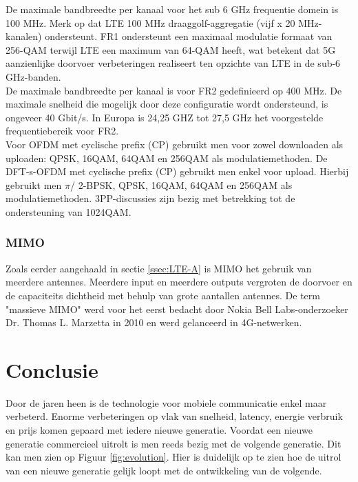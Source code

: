 \documentclass{article}
\begin{document}
\noindent De maximale bandbreedte per kanaal voor het sub 6 GHz frequentie domein is 100 MHz. Merk op dat LTE 100 MHz draaggolf-aggregatie (vijf x 20 MHz-kanalen) ondersteunt. FR1 ondersteunt een maximaal modulatie formaat van 256-QAM terwijl LTE een maximum van 64-QAM heeft, wat betekent dat 5G aanzienlijke doorvoer verbeteringen realiseert ten opzichte van LTE in de sub-6 GHz-banden. \cite{5gband} \cite{5gmodulation} \\

\noindent De maximale bandbreedte per kanaal is voor FR2 gedefinieerd op 400 MHz. De maximale snelheid die mogelijk door deze configuratie wordt ondersteund, is ongeveer 40 Gbit/s. In Europa is 24,25 GHZ tot 27,5 GHz het voorgestelde frequentiebereik voor FR2. \cite{5gband}\\

\noindent Voor OFDM met cyclische prefix (CP) gebruikt men voor zowel downloaden als uploaden: QPSK, 16QAM, 64QAM en 256QAM als modulatiemethoden. De DFT-s-OFDM met cyclische prefix (CP) gebruikt men enkel voor upload. Hierbij gebruikt men $\pi$/ 2-BPSK, QPSK, 16QAM, 64QAM en 256QAM als modulatiemethoden. 3PP-discussies zijn bezig met betrekking tot de ondersteuning van 1024QAM. \cite{5gmodulation}\\



\subsubsection{MIMO}
Zoals eerder aangehaald in sectie \ref{ssec:LTE-A} is MIMO het gebruik van meerdere antennes. Meerdere input en meerdere outputs vergroten de doorvoer en de capaciteits dichtheid met behulp van grote aantallen antennes. De term "massieve MIMO" werd voor het eerst bedacht door Nokia Bell Labs-onderzoeker Dr. Thomas L. Marzetta in 2010 en werd gelanceerd in 4G-netwerken. \cite{mimo}




\section{Conclusie}
Door de jaren heen is de technologie voor mobiele communicatie enkel maar verbeterd. Enorme verbeteringen op vlak van snelheid, latency, energie verbruik en prijs komen gepaard met iedere nieuwe generatie. Voordat een nieuwe generatie commercieel uitrolt is men reeds bezig met de volgende generatie. Dit kan men zien op Figuur \ref{fig:evolution}. Hier is duidelijk op te zien hoe de uitrol van een nieuwe generatie gelijk loopt met de ontwikkeling van de volgende.\\
\end{document}
